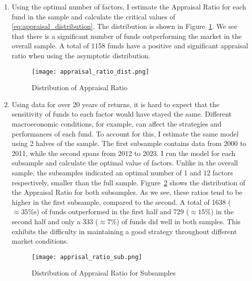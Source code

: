 \begin{solution}
\begin{enumerate}[label = \Alph*)]
    \item Using the optimal number of factors, I estimate the Appraisal Ratio for each fund in the sample and calculate the critical values of \eqref{eq:appraisal_distribution}. The distribution is shown in Figure~\ref{fig:appraisal_dist}. We see that there is a significant number of funds outperforming the market in the overall sample. A total of 1158 funds have a positive and significant appraisal ratio when using the asymptotic distribution.
    
    \begin{figure}[!htbp]
        \begin{small}
            \begin{center}
                \texttt{[image: appraisal\_ratio\_dist.png]}
            \end{center}
            \caption{Distribution of Appraisal Ratio}
            \label{fig:appraisal_dist}
        \end{small}
    \end{figure}
    
    \item Using data for over 20 years of returns, it is hard to expect that the sensitivity of funds to each factor would have stayed the same. Different macroeconomic conditions, for example, can affect the strategies and performances of each fund. To account for this, I estimate the same model using 2 halves of the sample. The first subsample contains data from 2000 to 2011, while the second spans from 2012 to 2023. I run the model for each subsample and calculate the optimal value of factors. Unlike in the overall sample, the subsamples indicated an optimal number of 1 and 12 factors respectively, smaller than the full sample. Figure~\ref{fig:ck_appraisal_sub} shows the distribution of the Appraisal Ratio for both subsamples. As we see, these ratios tend to be higher in the first subsample, compared to the second. A total of 1638 (\(\approx 35\%\)s) of funds outperformed in the first half and 729 (\(\approx 15\%\)) in the second half and only a 333 (\(\approx 7\%\)) of funds did well in both samples. This exhibits the difficulty in maintaining a good strategy throughout different market conditions.
    
    \begin{figure}[!htbp]
        \begin{small}
            \begin{center}
                \texttt{[image: apprisal\_ratio\_sub.png]}
            \end{center}
            \caption{Distribution of Appraisal Ratio for Subsamples}
            \label{fig:ck_appraisal_sub}
        \end{small}
    \end{figure}
    
\end{enumerate}
\end{solution}